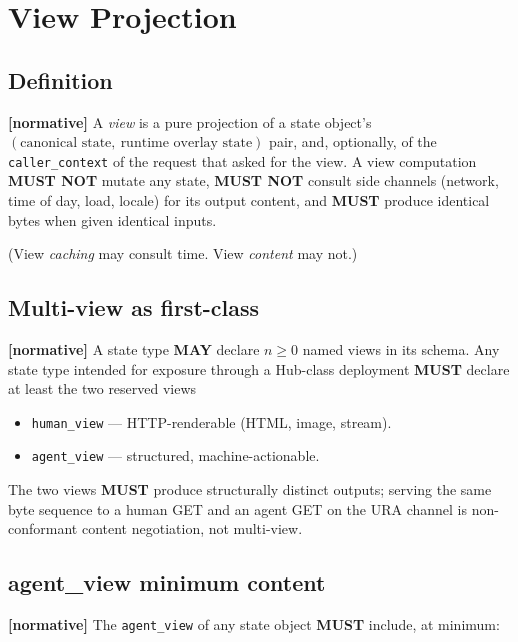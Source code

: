 \documentclass[11pt,a4paper]{article}
\newcommand{\normsv}{\textcolor{normativecolor}{\textbf{[normative]}}\xspace}
\theoremstyle{definition}
\begin{document}
\section{View Projection}
\label{sec:view-projection}

\subsection{Definition}

\normsv{}
A \emph{view} is a pure projection of a state object's
$(\text{canonical state},\ \text{runtime overlay state})$ pair, and,
optionally, of the \texttt{caller\_context} of the request that
asked for the view. A view computation \textbf{MUST NOT} mutate any
state, \textbf{MUST NOT} consult side channels (network, time of
day, load, locale) for its output content, and \textbf{MUST}
produce identical bytes when given identical inputs.

(View \emph{caching} may consult time. View \emph{content} may not.)

\subsection{Multi-view as first-class}

\normsv{}
A state type \textbf{MAY} declare $n \geq 0$ named views in its
schema. Any state type intended for exposure through a Hub-class
deployment \textbf{MUST} declare at least the two reserved views

\begin{itemize}[leftmargin=2em,itemsep=0.2em]
    \item \texttt{human\_view} --- HTTP-renderable (HTML, image,
    stream).
    \item \texttt{agent\_view} --- structured, machine-actionable.
\end{itemize}

The two views \textbf{MUST} produce structurally distinct outputs;
serving the same byte sequence to a human GET and an agent GET on
the URA channel is non-conformant content negotiation, not
multi-view.

\subsection{agent\_view minimum content}
\label{sec:agent-view-min}

\normsv{}
The \texttt{agent\_view} of any state object \textbf{MUST}
include, at minimum:
\end{document}

